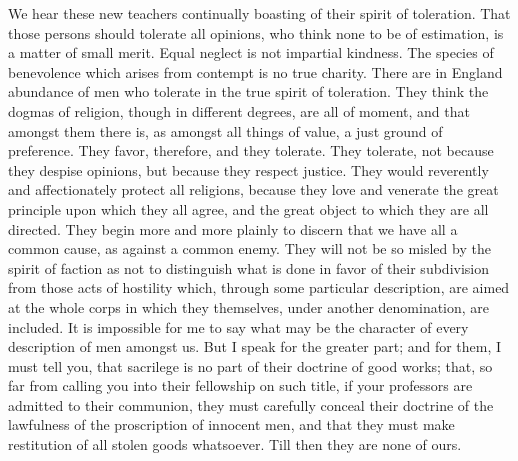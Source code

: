 We hear these new teachers continually boasting of their spirit of toleration. That those persons should tolerate all opinions, who think none to be of estimation, is a matter of small merit. Equal neglect is not impartial kindness. The species of benevolence which arises from contempt is no true charity. There are in England abundance of men who tolerate in the true spirit of toleration. They think the dogmas of religion, though in different degrees, are all of moment, and that amongst them there is, as amongst all things of value, a just ground of preference. They favor, therefore, and they tolerate. They tolerate, not because they despise opinions, but because they respect justice. They would reverently and affectionately protect all religions, because they love and venerate the great principle upon which they all agree, and the great object to which they are all directed. They begin more and more plainly to discern that we have all a common cause, as against a common enemy. They will not be so misled by the spirit of faction as not to distinguish what is done in favor of their subdivision from those acts of hostility which, through some particular description, are aimed at the whole corps in which they themselves, under another denomination, are included. It is impossible for me to say what may be the character of every description of men amongst us. But I speak for the greater part; and for them, I must tell you, that sacrilege is no part of their doctrine of good works; that, so far from calling you into their fellowship on such title, if your professors are admitted to their communion, they must carefully conceal their doctrine of the lawfulness of the proscription of innocent men, and that they must make restitution of all stolen goods whatsoever. Till then they are none of ours.

